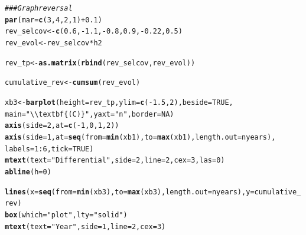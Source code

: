 \documentclass{article}\usepackage[]{graphicx}\usepackage[]{color}
\makeatletter
\newcommand{\hlnum}[1]{\textcolor[rgb]{0.686,0.059,0.569}{#1}}%
\newcommand{\hlstr}[1]{\textcolor[rgb]{0.192,0.494,0.8}{#1}}%
\newcommand{\hlcom}[1]{\textcolor[rgb]{0.678,0.584,0.686}{\textit{#1}}}%
\newcommand{\hlopt}[1]{\textcolor[rgb]{0,0,0}{#1}}%
\newcommand{\hlstd}[1]{\textcolor[rgb]{0.345,0.345,0.345}{#1}}%
\newcommand{\hlkwb}[1]{\textcolor[rgb]{0.69,0.353,0.396}{#1}}%
\newcommand{\hlkwc}[1]{\textcolor[rgb]{0.333,0.667,0.333}{#1}}%
\newcommand{\hlkwd}[1]{\textcolor[rgb]{0.737,0.353,0.396}{\textbf{#1}}}%
\newenvironment{kframe}{%
 \def\at@end@of@kframe{}%
 \ifinner\ifhmode%
  \def\at@end@of@kframe{\end{minipage}}%
  \begin{minipage}{\columnwidth}%
 \fi\fi%
 \def\FrameCommand##1{\hskip\@totalleftmargin \hskip-\fboxsep
 \colorbox{shadecolor}{##1}\hskip-\fboxsep
     \hskip-\linewidth \hskip-\@totalleftmargin \hskip\columnwidth}%
 \MakeFramed {\advance\hsize-\width
   \@totalleftmargin\z@ \linewidth\hsize
   \@setminipage}}%
 {\par\unskip\endMakeFramed%
 \at@end@of@kframe}
\newenvironment{knitrout}{}{} %
\makeatother
\begin{document}
\begin{knitrout}
\begin{kframe}
\begin{alltt}
\hlcom{### Graph reversal}
\hlkwd{par}\hlstd{(}\hlkwc{mar}\hlstd{=}\hlkwd{c}\hlstd{(}\hlnum{3}\hlstd{,} \hlnum{4}\hlstd{,} \hlnum{2}\hlstd{,}\hlnum{1}\hlstd{)} \hlopt{+} \hlnum{0.1}\hlstd{)}
\hlstd{rev_selcov} \hlkwb{<-} \hlkwd{c}\hlstd{(}\hlnum{0.6}\hlstd{,}\hlopt{-}\hlnum{1.1}\hlstd{,}\hlopt{-}\hlnum{0.8}\hlstd{,}\hlnum{0.9}\hlstd{,}\hlopt{-}\hlnum{0.22}\hlstd{,}\hlnum{0.5}\hlstd{)}
\hlstd{rev_evol} \hlkwb{<-} \hlstd{rev_selcov} \hlopt{*} \hlstd{h2}

\hlstd{rev_tp} \hlkwb{<-} \hlkwd{as.matrix}\hlstd{(}\hlkwd{rbind}\hlstd{(rev_selcov, rev_evol))}

\hlstd{cumulative_rev} \hlkwb{<-} \hlkwd{cumsum}\hlstd{(rev_evol)}

\hlstd{xb3} \hlkwb{<-} \hlkwd{barplot}\hlstd{(}\hlkwc{height} \hlstd{= rev_tp,} \hlkwc{ylim} \hlstd{=} \hlkwd{c}\hlstd{(}\hlopt{-}\hlnum{1.5}\hlstd{,}\hlnum{2}\hlstd{),} \hlkwc{beside} \hlstd{=} \hlnum{TRUE}\hlstd{,}
               \hlkwc{main}\hlstd{=}\hlstr{"\textbackslash{}\textbackslash{}textbf\{(C)\}"}\hlstd{,} \hlkwc{yaxt}\hlstd{=}\hlstr{"n"}\hlstd{,} \hlkwc{border} \hlstd{=} \hlnum{NA}\hlstd{)}
\hlkwd{axis}\hlstd{(}\hlkwc{side}\hlstd{=}\hlnum{2}\hlstd{,} \hlkwc{at} \hlstd{=} \hlkwd{c}\hlstd{(}\hlopt{-}\hlnum{1}\hlstd{,}\hlnum{0}\hlstd{,}\hlnum{1}\hlstd{,}\hlnum{2}\hlstd{))}
\hlkwd{axis}\hlstd{(}\hlkwc{side}\hlstd{=}\hlnum{1}\hlstd{,} \hlkwc{at} \hlstd{=} \hlkwd{seq}\hlstd{(}\hlkwc{from}\hlstd{=}\hlkwd{min}\hlstd{(xb1),} \hlkwc{to}\hlstd{=}\hlkwd{max}\hlstd{(xb1),} \hlkwc{length.out} \hlstd{= nyears),}
     \hlkwc{labels} \hlstd{=} \hlnum{1}\hlopt{:}\hlnum{6}\hlstd{,}\hlkwc{tick} \hlstd{=} \hlnum{TRUE}\hlstd{)}
\hlkwd{mtext}\hlstd{(}\hlkwc{text} \hlstd{=} \hlstr{"Differential"}\hlstd{,} \hlkwc{side} \hlstd{=} \hlnum{2}\hlstd{,} \hlkwc{line} \hlstd{=} \hlnum{2}\hlstd{,} \hlkwc{cex}\hlstd{=}\hlnum{3}\hlstd{,} \hlkwc{las}\hlstd{=}\hlnum{0}\hlstd{)}
\hlkwd{abline}\hlstd{(}\hlkwc{h}\hlstd{=}\hlnum{0}\hlstd{)}

\hlkwd{lines}\hlstd{(}\hlkwc{x}\hlstd{=}\hlkwd{seq}\hlstd{(}\hlkwc{from}\hlstd{=}\hlkwd{min}\hlstd{(xb3),} \hlkwc{to}\hlstd{=}\hlkwd{max}\hlstd{(xb3),} \hlkwc{length.out} \hlstd{= nyears),} \hlkwc{y}\hlstd{=cumulative_rev)}
\hlkwd{box}\hlstd{(}\hlkwc{which} \hlstd{=} \hlstr{"plot"}\hlstd{,} \hlkwc{lty} \hlstd{=} \hlstr{"solid"}\hlstd{)}
\hlkwd{mtext}\hlstd{(}\hlkwc{text} \hlstd{=} \hlstr{"Year"}\hlstd{,} \hlkwc{side} \hlstd{=} \hlnum{1}\hlstd{,} \hlkwc{line} \hlstd{=} \hlnum{2}\hlstd{,} \hlkwc{cex}\hlstd{=}\hlnum{3}\hlstd{)}


\end{alltt}
\end{kframe}
\end{knitrout}
\end{document}

